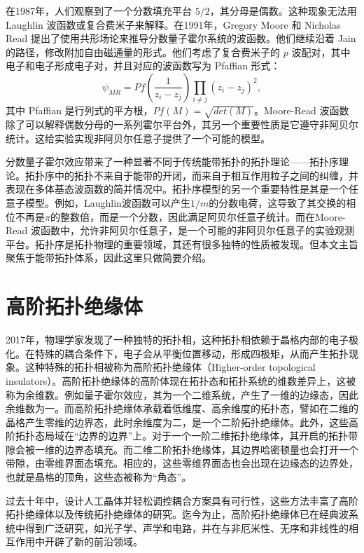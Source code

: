 在1987年，人们观察到了一个分数填充平台 $5/2$，其分母是偶数\cite{willett1987observation}。这种现象无法用 Laughlin 波函数或复合费米子来解释。在1991年，Gregory Moore 和 Nicholas Read 提出了使用共形场论来推导分数量子霍尔系统的波函数\cite{moore1991nonabelions}。他们继续沿着 Jain 的路径，修改附加自由磁通量的形式。他们考虑了复合费米子的 $p$ 波配对，其中电子和电子形成电子对，并且对应的波函数写为 Pfaffian 形式：
\begin{equation}
    \psi_{MR}=Pf\left(\frac{1}{z_i-z_j}\right)\prod_{i \neq j}\left(z_i-z_j\right)^{2},
\end{equation}
其中 Pfaffian 是行列式的平方根，$Pf(M)=\sqrt{det(M)}$。Moore-Read 波函数除了可以解释偶数分母的一系列霍尔平台外，其另一个重要性质是它遵守非阿贝尔统计。这给实验实现非阿贝尔任意子提供了一个可能的模型。

分数量子霍尔效应带来了一种显著不同于传统能带拓扑的拓扑理论——拓扑序理论。拓扑序中的拓扑不来自于能带的开闭，而来自于相互作用粒子之间的纠缠，并表现在多体基态波函数的简并情况中。拓扑序模型的另一个重要特性是其是一个任意子模型。例如，Laughlin波函数可以产生$1/m$的分数电荷，这导致了其交换的相位不再是$\pi$的整数倍，而是一个分数，因此满足阿贝尔任意子统计。而在Moore-Read 波函数中，允许非阿贝尔任意子，是一个可能的非阿贝尔任意子的实验观测平台。拓扑序是拓扑物理的重要领域，其还有很多独特的性质被发现。但本文主旨聚焦于能带拓扑体系，因此这里只做简要介绍。

\section{高阶拓扑绝缘体}
2017年，物理学家发现了一种独特的拓扑相\cite{benalcazar2017quantized}，这种拓扑相依赖于晶格内部的电子极化。在特殊的耦合条件下，电子会从平衡位置移动，形成四极矩，从而产生拓扑现象。这种特殊的拓扑相被称为高阶拓扑绝缘体（Higher-order topological insulators）\cite{schindler2018higher,xie2021higher}。高阶拓扑绝缘体的高阶体现在拓扑态和拓扑系统的维数差异上，这被称为余维数。例如量子霍尔效应，其为一个二维系统，产生了一维的边缘态，因此余维数为一。而高阶拓扑绝缘体承载着低维度、高余维度的拓扑态，譬如在二维的晶格产生零维的边界态，此时余维度为二，是一个二阶拓扑绝缘体。此外，这些高阶拓扑态局域在“边界的边界”上。对于一个一阶二维拓扑绝缘体，其开启的拓扑带隙会被一维的边界态填充。而二维二阶拓扑绝缘体，其边界哈密顿量也会打开一个带隙，由零维界面态填充。相应的，这些零维界面态也会出现在边缘态的边界处，也就是晶格的顶角，这些态被称为“角态”。

过去十年中，设计人工晶体并轻松调控耦合方案具有可行性，这些方法丰富了高阶拓扑绝缘体以及传统拓扑绝缘体的研究。迄今为止，高阶拓扑绝缘体已在经典波系统中得到广泛研究，如光子学\cite{peterson2018quantized,xie2018second,chen2019direct,xie2019visualization,mittal2019photonic,ota2019photonic,el2019corner,he2020quadrupole,zhang2020higher,li2020higher}、声学\cite{serra2018observation,zhang2019dimensional,xue2019realization,qi2020acoustic,xue2020observation,weiner2020demonstration,ni2020demonstration}和电路\cite{imhof2018topolectrical,bao2019topoelectrical,zhang2019dimensional,liu2020octupole,zhang2021experimental}，并在与非厄米性\cite{luo2019higher,gao2021non}、无序\cite{zhang2021experimental,chen2020higher,li2020topological}和非线性\cite{zangeneh2019nonlinear,kirsch2021nonlinear}的相互作用中开辟了新的前沿领域。
